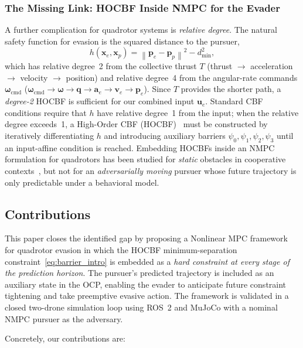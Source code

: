 \documentclass[lettersize,journal]{IEEEtran}
\theoremstyle{definition}
\theoremstyle{remark}
\newcommand{\norm}[1]{\left\| #1 \right\|}
\newcommand{\vect}[1]{\bm{#1}}
\begin{document}
\subsubsection{The Missing Link: HOCBF Inside NMPC for the Evader}
A further complication for quadrotor systems is
\emph{relative degree}.
The natural safety function for evasion is the squared distance to
the pursuer,
\begin{equation}
    h(\vect{x}_e, \vect{x}_p)
        = \norm{\vect{p}_e - \vect{p}_p}^2 - d_{\min}^2,
    \label{eq:barrier_intro}
\end{equation}
which has relative degree~2 from the collective thrust $T$
(thrust $\to$ acceleration $\to$ velocity $\to$ position)
and relative degree~4 from the angular-rate commands
$\vect{\omega}_{\mathrm{cmd}}$
($\vect{\omega}_{\mathrm{cmd}} \to \vect{\omega} \to \vect{q} \to
 \vect{a}_e \to \vect{v}_e \to \vect{p}_e$).
Since $T$ provides the shorter path, a \emph{degree-2} HOCBF
is sufficient for our combined input $\vect{u}_e$.
Standard CBF conditions require that $h$ have relative degree~1
from the input; when the relative degree exceeds~1, a
High-Order CBF (HOCBF)~\cite{xiao2021high} must be constructed by
iteratively differentiating $h$ and introducing auxiliary barriers
$\psi_0,\psi_1,\psi_2,\psi_3$ until an input-affine condition is
reached.
Embedding HOCBFs inside an NMPC formulation for quadrotors has been
studied for \emph{static} obstacles in cooperative
contexts~\cite{zeng2021enhancing, zhu2025exponential}, but not
for an \emph{adversarially moving} pursuer whose future trajectory
is only predictable under a behavioral model.

\subsection{Contributions}

This paper closes the identified gap by proposing a Nonlinear MPC
framework for quadrotor evasion in which the HOCBF minimum-separation
constraint~\eqref{eq:barrier_intro} is embedded as a \emph{hard
constraint at every stage of the prediction horizon}.
The pursuer's predicted trajectory is included as an auxiliary
state in the OCP, enabling the evader to anticipate future
constraint tightening and take preemptive evasive action.
The framework is validated in a closed two-drone simulation loop
using ROS~2 and MuJoCo with a nominal NMPC pursuer as the adversary.

Concretely, our contributions are:
\end{document}
